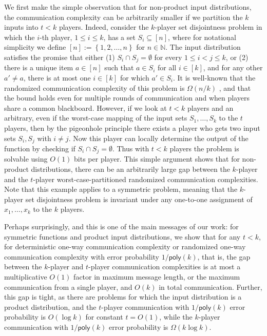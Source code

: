 \documentclass[11pt]{article}
\numberwithin{equation}{section}
\theoremstyle{definition}
\theoremstyle{plain}
\newcommand{\N}{\mathbb N}
\newcommand{\set}[1]{{\left \{{#1} \right \}}}
\newcommand{\poly}{\mathsf{poly}}
\newcommand{\bigo}[1]{\ensuremath{{{O} \left( {#1} \right)}}}
\newcommand{\bigomega}[1]{\ensuremath{{\Omega \left( {#1} \right)}}}
\newcommand{\eqdef}{\ensuremath{:=}}
\begin{document}
We first make the simple observation that for non-product input distributions, the communication complexity can be arbitrarily smaller if we partition the $k$ inputs into $t < k$ players. 
Indeed, consider the $k$-player set disjointness problem in which the $i$-th player, $1 \leq i \leq k$, has a set $S_i \subseteq [n]$, 
where for notational simplicity we define $[n]\eqdef \set{1,2,\dots, n}$ for $n\in \N$. 
The input distribution satisfies the promise that either (1) $S_i \cap S_j = \emptyset$ for every $1\le i < j \le k$, or (2) there is a unique item $a \in [n]$ such that $a \in S_i$ for all $i \in [k]$, and for any other $a' \neq a$, there is at most one $i \in [k]$ for which $a' \in S_i$. It is well-known that the randomized communication complexity of this problem is $\bigomega{n/k}$ \cite{BarYossef:2004eya,g09,jayram2009hellinger}, and that the bound holds even for multiple rounds of communication and when players share a common blackboard. 
However, if we look at $t < k$ players and an arbitrary, even if the worst-case mapping of the input sets $S_1, \ldots, S_k$ to the $t$ players, then by the pigeonhole principle there exists a player who gets two input sets $S_i, S_j$ with $i \ne j$. 
Now this player can locally determine the output of the function by checking if $S_i \cap S_j=\emptyset$. 
Thus with $t < k$ players the problem is solvable using $\bigo{1}$ bits per player. This simple argument shows that for non-product distributions, there can be an arbitrarily large gap between the $k$-player and the $t$-player worst-case-partitioned randomized communication complexities. 
Note that this example applies to a symmetric problem, meaning that the $k$-player set disjointness problem is invariant under any one-to-one assignment of $x_1, \ldots, x_k$ to the $k$ players.

Perhaps surprisingly, and this is one of the main messages of our work: for symmetric functions and product input distributions, we show that for any $t < k$, for deterministic one-way communication complexity or randomized one-way communication complexity with error probability $1/\poly(k)$, that is, the gap between the $k$-player and $t$-player communication complexities is at most a multiplicative $\bigo{1}$ factor in maximum message length, or the maximum communication from a single player, and $O(k)$ in total communication. Further, this gap is tight, as there are problems for which the input distribution is a product distribution, and the $t$-player communication with $1/\poly(k)$ error probability is $\bigo{\log k}$ for constant $t=\bigo{1}$, while the $k$-player communication with $1/\poly(k)$ error probability is $\bigomega{k \log k}$. 
\end{document}
